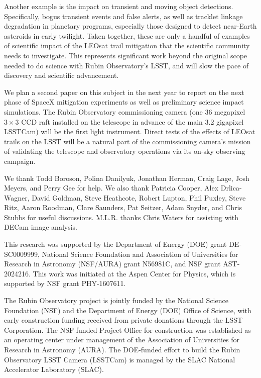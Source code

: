 \documentclass[twocolumn,trackchanges]{aastex63}
\begin{document}
Another example is the impact on transient and moving object detections. Specifically, bogus transient events and false alerts, as well as tracklet linkage degradation in planetary programs, especially those designed to detect near-Earth asteroids in early twilight. Taken together, these are only a handful of examples of scientific impact of the LEOsat trail mitigation that the scientific community needs to investigate. This represents significant work beyond the original scope needed to do science with Rubin Observatory's LSST, and will slow the pace of discovery and scientific advancement.

We plan a second paper on this subject in the next year to report on the next phase of SpaceX mitigation experiments as well as preliminary science impact simulations. The Rubin Observatory commissioning camera (one 36 megapixel $3\times3$ CCD raft installed on the telescope in advance of the main 3.2 gigapixel LSSTCam) will be the first light instrument. Direct tests of the effects of LEOsat trails on the LSST will be a natural part of the commissioning camera's mission of validating the telescope and observatory operations via its on-sky observing campaign.


\acknowledgments

We thank Todd Boroson, Polina Danilyuk, Jonathan Herman, Craig Lage, Josh Meyers, and Perry Gee for help. We also thank Patricia Cooper, Alex Drlica-Wagner, David Goldman, Steve Heathcote, Robert Lupton, Phil Puxley, Steve Ritz, Aaron Roodman, Clare Saunders, Pat Seitzer, Adam Snyder, and Chris Stubbs for useful discussions. M.L.R. thanks Chris Waters for assisting with DECam image analysis.

This research was supported by the Department of Energy (DOE) grant DE-SC0009999, National Science Foundation and Association of Universities for Research in Astronomy (NSF/AURA) grant N56981C, and NSF grant AST-2024216. This work was initiated at the Aspen Center for Physics, which is supported by NSF grant PHY-1607611.

The Rubin Observatory project is jointly funded by the National Science Foundation (NSF) and the Department of Energy (DOE) Office of Science, with early construction funding received from private donations through the LSST Corporation. The NSF-funded Project Office for construction was established as an operating center under management of the Association of Universities for Research in Astronomy (AURA). The DOE-funded effort to build the Rubin Observatory LSST Camera (LSSTCam) is managed by the SLAC National Accelerator Laboratory (SLAC).
\end{document}
